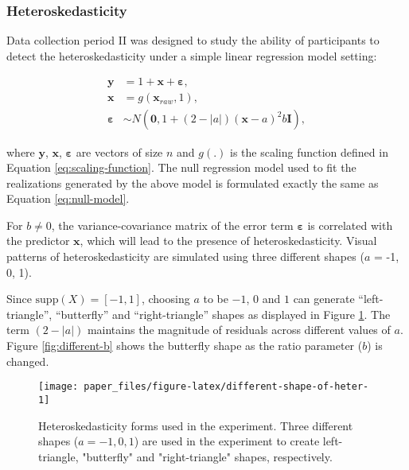 \documentclass[]{interact}
\theoremstyle{plain}%
\theoremstyle{definition}
\theoremstyle{remark}
\begin{document}
\hypertarget{heteroskedasticity}{%
\subsubsection{Heteroskedasticity}\label{heteroskedasticity}}

Data collection period II was designed to study the ability of
participants to detect the heteroskedasticity under a simple linear
regression model setting:

\begin{align*} \label{eq:heter-model}
\boldsymbol{y} &= 1 + \boldsymbol{x} + \boldsymbol{\varepsilon},\\
\boldsymbol{x} &= g(\boldsymbol{x}_{raw}, 1),\\
\boldsymbol{\varepsilon} &\sim N(\boldsymbol{0}, 1 + (2 - |a|)(\boldsymbol{x} - a)^2b \boldsymbol{I}), 
\end{align*}

\noindent where \(\boldsymbol{y}\), \(\boldsymbol{x}\),
\(\boldsymbol{\varepsilon}\) are vectors of size \(n\) and \(g(.)\) is
the scaling function defined in Equation \ref{eq:scaling-function}. The
null regression model used to fit the realizations generated by the
above model is formulated exactly the same as Equation
\ref{eq:null-model}.

For \(b \neq 0\), the variance-covariance matrix of the error term
\(\boldsymbol{\varepsilon}\) is correlated with the predictor
\(\boldsymbol{x}\), which will lead to the presence of
heteroskedasticity. Visual patterns of heteroskedasticity are simulated
using three different shapes (\(a\) = -1, 0, 1).

Since \(\text{supp}(X) = [-1, 1]\), choosing \(a\) to be \(-1\), \(0\)
and \(1\) can generate ``left-triangle'', ``butterfly'' and
``right-triangle'' shapes as displayed in Figure
\ref{fig:different-shape-of-heter}. The term \((2 - |a|)\) maintains the
magnitude of residuals across different values of \(a\). Figure
\ref{fig:different-b} shows the butterfly shape as the ratio parameter
(\(b\)) is changed.

\begin{figure}[!h]

{\centering \texttt{[image: paper\_files/figure-latex/different-shape-of-heter-1]} 

}

\caption{Heteroskedasticity forms used in the experiment. Three different shapes ($a = -1, 0, 1$) are used in the experiment to create left-triangle, "butterfly" and "right-triangle" shapes, respectively.}\label{fig:different-shape-of-heter}
\end{figure}
\end{document}
